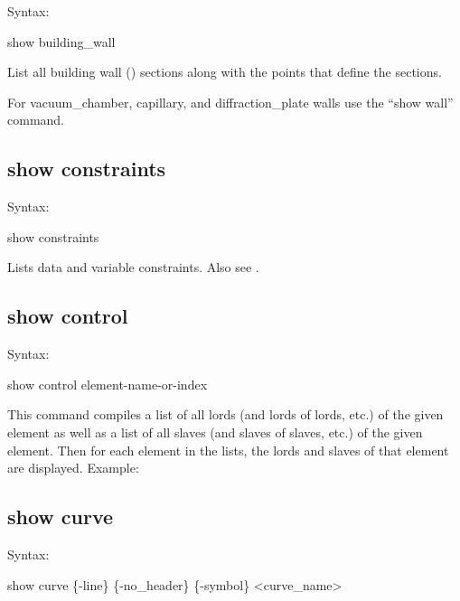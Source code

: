 {{{{{{{{Syntax:
\begin{example}
  show building_wall
\end{example}
 

List all building wall () sections along with the points that define
the sections.

For vacuum_chamber, capillary, and diffraction_plate walls use the ``show wall'' command.


\subsection{show constraints}
\label{s:show.constraints}

Syntax:
\begin{example}
  show constraints
\end{example}

Lists data and variable constraints. Also see .


\subsection{show control}
\label{s:show.control}

Syntax:
\begin{example}
  show control {element-name-or-index}
\end{example}

This command compiles a list of all lords (and lords of lords, etc.) of the given element as well as
a list of all slaves (and slaves of slaves, etc.) of the given element. Then for each element in
the lists, the lords and slaves of that element are displayed. Example:


\subsection{show curve}
\label{s:show.curve}

Syntax:
\begin{example}
  show curve \{-line\} \{-no_header\} \{-symbol\} <curve_name>
\end{example}

}}}}}}}}
